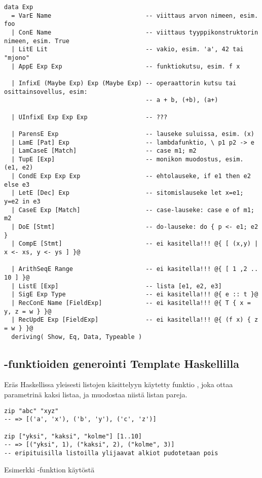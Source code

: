 \begin{verbatim}
data Exp
  = VarE Name                          -- viittaus arvon nimeen, esim. foo
  | ConE Name                          -- viittaus tyyppikonstruktorin nimeen, esim. True
  | LitE Lit                           -- vakio, esim. 'a', 42 tai "mjono"
  | AppE Exp Exp                       -- funktiokutsu, esim. f x

  | InfixE (Maybe Exp) Exp (Maybe Exp) -- operaattorin kutsu tai osittainsovellus, esim:
                                       -- a + b, (+b), (a+)

  | UInfixE Exp Exp Exp                -- ???

  | ParensE Exp                        -- lauseke suluissa, esim. (x)
  | LamE [Pat] Exp                     -- lambdafunktio, \ p1 p2 -> e
  | LamCaseE [Match]                   -- case m1; m2
  | TupE [Exp]                         -- monikon muodostus, esim. (e1, e2)
  | CondE Exp Exp Exp                  -- ehtolauseke, if e1 then e2 else e3
  | LetE [Dec] Exp                     -- sitomislauseke let x=e1; y=e2 in e3
  | CaseE Exp [Match]                  -- case-lauseke: case e of m1; m2
  | DoE [Stmt]                         -- do-lauseke: do { p <- e1; e2 }
  | CompE [Stmt]                       -- ei kasitella!!! @{ [ (x,y) | x <- xs, y <- ys ] }@

  | ArithSeqE Range                    -- ei kasitella!!! @{ [ 1 ,2 .. 10 ] }@
  | ListE [Exp]                        -- lista [e1, e2, e3]
  | SigE Exp Type                      -- ei kasitella!!! @{ e :: t }@
  | RecConE Name [FieldExp]            -- ei kasitella!!! @{ T { x = y, z = w } }@
  | RecUpdE Exp [FieldExp]             -- ei kasitella!!! @{ (f x) { z = w } }@
  deriving( Show, Eq, Data, Typeable )
\end{verbatim}

\subsection{-funktioiden generointi Template Haskellilla}

Eräs Haskellissa yleisesti listojen käsittelyyn käytetty funktio ,
joka ottaa parametrinä kaksi listaa,
ja muodostaa niistä listan pareja.

\begin{listing}[H]
\begin{verbatim}
zip "abc" "xyz"
-- => [('a', 'x'), ('b', 'y'), ('c', 'z')]

zip ["yksi", "kaksi", "kolme"] [1..10]
-- => [("yksi", 1), ("kaksi", 2), ("kolme", 3)]
-- eripituisilla listoilla ylijaavat alkiot pudotetaan pois
\end{verbatim}
\label{lst:zip-example}
\caption{Esimerkki -funktion käytöstä}
\end{listing}

